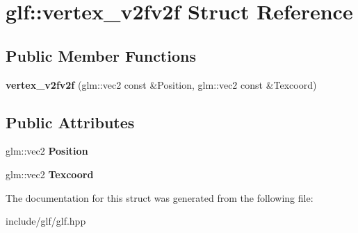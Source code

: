\hypertarget{structglf_1_1vertex__v2fv2f}{\section{glf\-:\-:vertex\-\_\-v2fv2f \-Struct \-Reference}
\label{structglf_1_1vertex__v2fv2f}
}
\subsection*{\-Public \-Member \-Functions}
\begin{DoxyCompactItemize}
\item 
\hypertarget{structglf_1_1vertex__v2fv2f_a77bb2896a9da65e0b94d47fd49e17cda}{{\bfseries vertex\-\_\-v2fv2f} (glm\-::vec2 const \&\-Position, glm\-::vec2 const \&\-Texcoord)}\label{structglf_1_1vertex__v2fv2f_a77bb2896a9da65e0b94d47fd49e17cda}

\end{DoxyCompactItemize}
\subsection*{\-Public \-Attributes}
\begin{DoxyCompactItemize}
\item 
\hypertarget{structglf_1_1vertex__v2fv2f_ad21f2d992f6b05c51863a59025e32d13}{glm\-::vec2 {\bfseries \-Position}}\label{structglf_1_1vertex__v2fv2f_ad21f2d992f6b05c51863a59025e32d13}

\item 
\hypertarget{structglf_1_1vertex__v2fv2f_a9c0b9a6cb52b37fd65ffb42ab919a2b7}{glm\-::vec2 {\bfseries \-Texcoord}}\label{structglf_1_1vertex__v2fv2f_a9c0b9a6cb52b37fd65ffb42ab919a2b7}

\end{DoxyCompactItemize}


\-The documentation for this struct was generated from the following file\-:\begin{DoxyCompactItemize}
\item 
include/glf/glf.\-hpp\end{DoxyCompactItemize}
